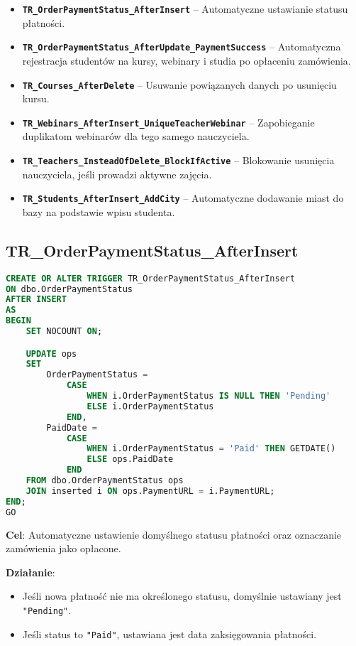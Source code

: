 \documentclass[12pt]{article}
\begin{document}
\begin{itemize}
    \item \textbf{\texttt{TR\_OrderPaymentStatus\_AfterInsert}}  
          – Automatyczne ustawianie statusu płatności.
    \item \textbf{\texttt{TR\_OrderPaymentStatus\_AfterUpdate\_PaymentSuccess}}  
          – Automatyczna rejestracja studentów na kursy, webinary i studia po opłaceniu zamówienia.
    \item \textbf{\texttt{TR\_Courses\_AfterDelete}}  
          – Usuwanie powiązanych danych po usunięciu kursu.
    \item \textbf{\texttt{TR\_Webinars\_AfterInsert\_UniqueTeacherWebinar}}  
          – Zapobieganie duplikatom webinarów dla tego samego nauczyciela.
    \item \textbf{\texttt{TR\_Teachers\_InsteadOfDelete\_BlockIfActive}}  
          – Blokowanie usunięcia nauczyciela, jeśli prowadzi aktywne zajęcia.
    \item \textbf{\texttt{TR\_Students\_AfterInsert\_AddCity}}  
          – Automatyczne dodawanie miast do bazy na podstawie wpisu studenta.
\end{itemize}

\subsection{TR\_OrderPaymentStatus\_AfterInsert}
\begin{lstlisting}[language=SQL]
CREATE OR ALTER TRIGGER TR_OrderPaymentStatus_AfterInsert
ON dbo.OrderPaymentStatus
AFTER INSERT
AS
BEGIN
    SET NOCOUNT ON;

    UPDATE ops
    SET
        OrderPaymentStatus =
            CASE
                WHEN i.OrderPaymentStatus IS NULL THEN 'Pending'
                ELSE i.OrderPaymentStatus
            END,
        PaidDate =
            CASE
                WHEN i.OrderPaymentStatus = 'Paid' THEN GETDATE()
                ELSE ops.PaidDate
            END
    FROM dbo.OrderPaymentStatus ops
    JOIN inserted i ON ops.PaymentURL = i.PaymentURL;
END;
GO
\end{lstlisting}

\noindent \textbf{Cel}: Automatyczne ustawienie domyślnego statusu płatności oraz oznaczanie zamówienia jako opłacone.  


\noindent \textbf{Działanie}:  
\begin{itemize}
    \item Jeśli nowa płatność nie ma określonego statusu, domyślnie ustawiany jest \texttt{"Pending"}.
    \item Jeśli status to \texttt{"Paid"}, ustawiana jest data zaksięgowania płatności.
\end{itemize}
\end{document}
